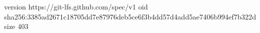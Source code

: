 version https://git-lfs.github.com/spec/v1
oid sha256:3385ad2671c18705dd7e87976deb5ce6f3b4dd57d4add5ae7406b994ef7b322d
size 403
